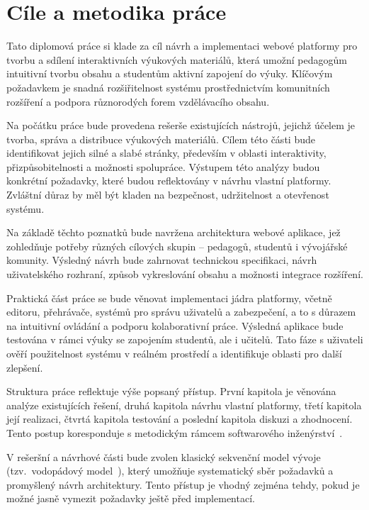 \chapter*{Cíle a metodika práce}

Tato diplomová práce si klade za cíl návrh a implementaci webové platformy pro tvorbu a sdílení interaktivních výukových materiálů, která umožní pedagogům intuitivní tvorbu obsahu a studentům aktivní zapojení do výuky. 
Klíčovým požadavkem je snadná rozšiřitelnost systému prostřednictvím komunitních rozšíření a podpora různorodých forem vzdělávacího obsahu.

Na počátku práce bude provedena rešerše existujících nástrojů, jejichž účelem je tvorba, správa a distribuce výukových materiálů. 
Cílem této části bude identifikovat jejich silné a slabé stránky, především v oblasti interaktivity, přizpůsobitelnosti a možnosti spolupráce. 
Výstupem této analýzy budou konkrétní požadavky, které budou reflektovány v návrhu vlastní platformy. 
Zvláštní důraz by měl být kladen na bezpečnost, udržitelnost a otevřenost systému.

Na základě těchto poznatků bude navržena architektura webové aplikace, jež zohledňuje potřeby různých cílových skupin -- pedagogů, studentů i vývojářské komunity.
Výsledný návrh bude zahrnovat technickou specifikaci, návrh uživatelského rozhraní, způsob vykreslování obsahu a možnosti integrace rozšíření.

Praktická část práce se bude věnovat implementaci jádra platformy, včetně editoru, přehrávače, systémů pro správu uživatelů a zabezpečení, a to s důrazem na intuitivní ovládání a podporu kolaborativní práce.
Výsledná aplikace bude testována v rámci výuky se zapojením studentů, ale i učitelů.
Tato fáze s uživateli ověří použitelnost systému v reálném prostředí a identifikuje oblasti pro další zlepšení.

Struktura práce reflektuje výše popsaný přístup. 
První kapitola je věnována analýze existujících řešení, druhá kapitola návrhu vlastní platformy, třetí kapitola její realizaci, čtvrtá kapitola testování a poslední kapitola diskuzi a zhodnocení. 
Tento postup koresponduje s metodickým rámcem softwarového inženýrství~\cite{laplante2007software}.

V rešeršní a návrhové části bude zvolen klasický sekvenční model vývoje (tzv.~vodopádový model~\cite{laplante2007software}), který umožňuje systematický sběr požadavků a promyšlený návrh architektury.
Tento přístup je vhodný zejména tehdy, pokud je možné jasně vymezit požadavky ještě před implementací.

